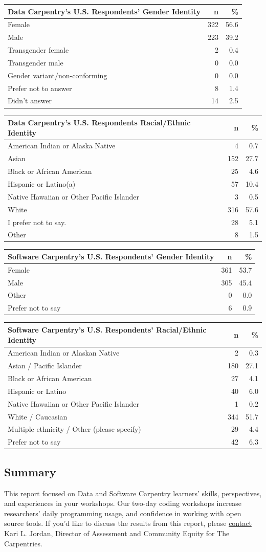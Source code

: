 \documentclass[]{article}
\begin{document}
\begin{longtable}[]{@{}lrr@{}}
\toprule
Data Carpentry's U.S. Respondents' Gender Identity & n &
\%\tabularnewline
\midrule
\endhead
Female & 322 & 56.6\tabularnewline
Male & 223 & 39.2\tabularnewline
Transgender female & 2 & 0.4\tabularnewline
Transgender male & 0 & 0.0\tabularnewline
Gender variant/non-conforming & 0 & 0.0\tabularnewline
Prefer not to answer & 8 & 1.4\tabularnewline
Didn't answer & 14 & 2.5\tabularnewline
\bottomrule
\end{longtable}

\begin{longtable}[]{@{}lrr@{}}
\toprule
Data Carpentry's U.S. Respondents Racial/Ethnic Identity & n &
\%\tabularnewline
\midrule
\endhead
American Indian or Alaska Native & 4 & 0.7\tabularnewline
Asian & 152 & 27.7\tabularnewline
Black or African American & 25 & 4.6\tabularnewline
Hispanic or Latino(a) & 57 & 10.4\tabularnewline
Native Hawaiian or Other Pacific Islander & 3 & 0.5\tabularnewline
White & 316 & 57.6\tabularnewline
I prefer not to say. & 28 & 5.1\tabularnewline
Other & 8 & 1.5\tabularnewline
\bottomrule
\end{longtable}

\begin{longtable}[]{@{}lrr@{}}
\toprule
Software Carpentry's U.S. Respondents' Gender Identity & n &
\%\tabularnewline
\midrule
\endhead
Female & 361 & 53.7\tabularnewline
Male & 305 & 45.4\tabularnewline
Other & 0 & 0.0\tabularnewline
Prefer not to say & 6 & 0.9\tabularnewline
\bottomrule
\end{longtable}

\begin{longtable}[]{@{}lrr@{}}
\toprule
Software Carpentry's U.S. Respondents' Racial/Ethnic Identity & n &
\%\tabularnewline
\midrule
\endhead
American Indian or Alaskan Native & 2 & 0.3\tabularnewline
Asian / Pacific Islander & 180 & 27.1\tabularnewline
Black or African American & 27 & 4.1\tabularnewline
Hispanic or Latino & 40 & 6.0\tabularnewline
Native Hawaiian or Other Pacific Islander & 1 & 0.2\tabularnewline
White / Caucasian & 344 & 51.7\tabularnewline
Multiple ethnicity / Other (please specify) & 29 & 4.4\tabularnewline
Prefer not to say & 42 & 6.3\tabularnewline
\bottomrule
\end{longtable}

\subsection{Summary}\label{summary}

This report focused on Data and Software Carpentry learners' skills,
perspectives, and experiences in your workshops. Our two-day coding
workshops increase researchers' daily programming usage, and confidence
in working with open source tools. If you'd like to discuss the results
from this report, please
\href{mailto:kariljordan@carpentries.org}{contact} Kari L. Jordan,
Director of Assessment and Community Equity for The Carpentries.
\end{document}
